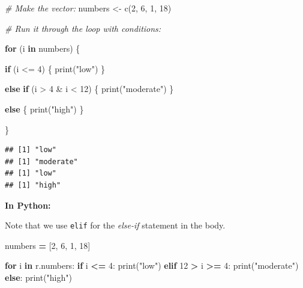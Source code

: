 \documentclass[
]{book}
\newenvironment{Shaded}{\begin{snugshade}}{\end{snugshade}}
\newcommand{\BuiltInTok}[1]{#1}
\newcommand{\CommentTok}[1]{\textcolor[rgb]{0.56,0.35,0.01}{\textit{#1}}}
\newcommand{\ControlFlowTok}[1]{\textcolor[rgb]{0.13,0.29,0.53}{\textbf{#1}}}
\newcommand{\DecValTok}[1]{\textcolor[rgb]{0.00,0.00,0.81}{#1}}
\newcommand{\FunctionTok}[1]{\textcolor[rgb]{0.00,0.00,0.00}{#1}}
\newcommand{\KeywordTok}[1]{\textcolor[rgb]{0.13,0.29,0.53}{\textbf{#1}}}
\newcommand{\NormalTok}[1]{#1}
\newcommand{\OperatorTok}[1]{\textcolor[rgb]{0.81,0.36,0.00}{\textbf{#1}}}
\newcommand{\OtherTok}[1]{\textcolor[rgb]{0.56,0.35,0.01}{#1}}
\newcommand{\SpecialCharTok}[1]{\textcolor[rgb]{0.00,0.00,0.00}{#1}}
\newcommand{\StringTok}[1]{\textcolor[rgb]{0.31,0.60,0.02}{#1}}
\begin{document}
\begin{Shaded}
\begin{Highlighting}[]
\CommentTok{\# Make the vector: }
\NormalTok{numbers }\OtherTok{\textless{}{-}} \FunctionTok{c}\NormalTok{(}\DecValTok{2}\NormalTok{, }\DecValTok{6}\NormalTok{, }\DecValTok{1}\NormalTok{, }\DecValTok{18}\NormalTok{)}

\CommentTok{\# Run it through the loop with conditions: }

\ControlFlowTok{for}\NormalTok{ (i }\ControlFlowTok{in}\NormalTok{ numbers) \{}
  
  \ControlFlowTok{if}\NormalTok{ (i }\SpecialCharTok{\textless{}=} \DecValTok{4}\NormalTok{) \{}
    \FunctionTok{print}\NormalTok{(}\StringTok{"low"}\NormalTok{)}
\NormalTok{  \}}
  
  \ControlFlowTok{else} \ControlFlowTok{if}\NormalTok{ (i }\SpecialCharTok{\textgreater{}} \DecValTok{4} \SpecialCharTok{\&}\NormalTok{ i }\SpecialCharTok{\textless{}} \DecValTok{12}\NormalTok{) \{}
    \FunctionTok{print}\NormalTok{(}\StringTok{"moderate"}\NormalTok{)}
\NormalTok{  \}}
  
  \ControlFlowTok{else}\NormalTok{ \{}
    \FunctionTok{print}\NormalTok{(}\StringTok{"high"}\NormalTok{)}
\NormalTok{  \}}
  
\NormalTok{\}}
\end{Highlighting}
\end{Shaded}

\begin{verbatim}
## [1] "low"
## [1] "moderate"
## [1] "low"
## [1] "high"
\end{verbatim}

\textbf{In Python:}

Note that we use \texttt{elif} for the \emph{else-if} statement in the body.

\begin{Shaded}
\begin{Highlighting}[]
\NormalTok{numbers }\OperatorTok{=}\NormalTok{ [}\DecValTok{2}\NormalTok{, }\DecValTok{6}\NormalTok{, }\DecValTok{1}\NormalTok{, }\DecValTok{18}\NormalTok{]}

\ControlFlowTok{for}\NormalTok{ i }\KeywordTok{in}\NormalTok{ r.numbers:}
  \ControlFlowTok{if}\NormalTok{ i }\OperatorTok{\textless{}=} \DecValTok{4}\NormalTok{:}
    \BuiltInTok{print}\NormalTok{(}\StringTok{"low"}\NormalTok{)}
  \ControlFlowTok{elif} \DecValTok{12} \OperatorTok{\textgreater{}}\NormalTok{ i }\OperatorTok{\textgreater{}=} \DecValTok{4}\NormalTok{:}
    \BuiltInTok{print}\NormalTok{(}\StringTok{"moderate"}\NormalTok{)}
  \ControlFlowTok{else}\NormalTok{:}
    \BuiltInTok{print}\NormalTok{(}\StringTok{"high"}\NormalTok{)}
\end{Highlighting}
\end{Shaded}
\end{document}
